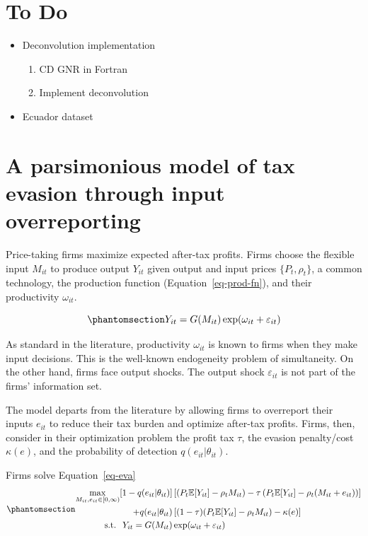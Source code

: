 \documentclass[
  12pt]{article}
\providecommand{\tightlist}{%
  \setlength{\itemsep}{0pt}\setlength{\parskip}{0pt}}\usepackage{longtable,booktabs,array}
\theoremstyle{definition}
\theoremstyle{remark}
\begin{document}
\section*{To Do}\label{to-do}

\begin{itemize}
\tightlist
\item
  Deconvolution implementation

  \begin{enumerate}
  \def\labelenumi{\arabic{enumi}.}
  \tightlist
  \item
    CD GNR in Fortran
  \item
    Implement deconvolution
  \end{enumerate}
\item
  Ecuador dataset
\end{itemize}

\section{A parsimonious model of tax evasion through input
overreporting}\label{a-parsimonious-model-of-tax-evasion-through-input-overreporting}

Price-taking firms maximize expected after-tax profits. Firms choose the
flexible input \(M_{it}\) to produce output \(Y_{it}\) given output and
input prices \(\{P_{t}, \rho_t\}\), a common technology, the production
function (Equation~\ref{eq-prod-fn}), and their productivity
\(\omega_{it}\).

\begin{equation}\phantomsection\label{eq-prod-fn}{
Y_{it}=G(M_{it})\exp(\omega_{it}+\varepsilon_{it})
}\end{equation}

As standard in the literature, productivity \(\omega_{it}\) is known to
firms when they make input decisions. This is the well-known endogeneity
problem of simultaneity. On the other hand, firms face output shocks.
The output shock \(\varepsilon_{it}\) is not part of the firms'
information set.

The model departs from the literature by allowing firms to overreport
their inputs \(e_{it}\) to reduce their tax burden and optimize
after-tax profits. Firms, then, consider in their optimization problem
the profit tax \(\tau\), the evasion penalty/cost \(\kappa(e)\), and the
probability of detection \(q(e_{it}|\theta_{it})\).

Firms solve Equation~\ref{eq-eva}
\begin{equation}\phantomsection\label{eq-eva}{
\begin{aligned}
  \max_{M_{it}, e_{it}\in [0,\infty)} [1-q(e_{it}|\theta_{it})]&\left[(P_t\mathbb{E}[Y_{it}]-\rho_{t} M_{it})-\tau\left(P_t\mathbb{E}[Y_{it}]-\rho_{t} (M_{it}+e_{it})\right)\right]\\
  +q(e_{it}|\theta_{it})&\left[(1-\tau)(P_t\mathbb{E}[Y_{it}]-\rho_{t} M_{it})-\kappa(e)\right] \\
  \text{s.t. }\; Y_{it}=G(M_{it})&\exp(\omega_{it}+\varepsilon_{it})
\end{aligned}
}\end{equation}
\end{document}

